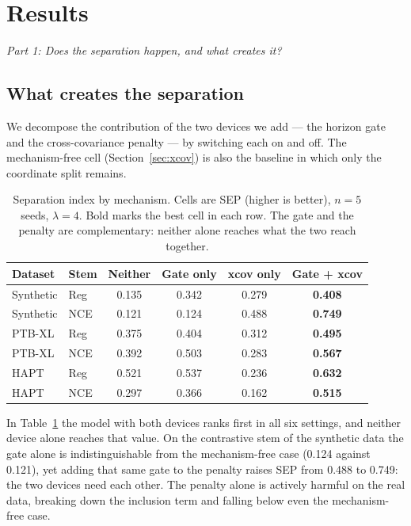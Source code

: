 \section{Results}

\medskip
\noindent\textit{Part 1: Does the separation happen, and what creates it?}

\subsection{What creates the separation}

We decompose the contribution of the two devices we add --- the horizon gate and the cross-covariance penalty --- by switching each on and off. The mechanism-free cell (Section~\ref{sec:xcov}) is also the baseline in which only the coordinate split remains.

\begin{table}[!tbp]
\caption{Separation index by mechanism. Cells are SEP (higher is better), $n=5$ seeds, $\lambda=4$. Bold marks the best cell in each row. The gate and the penalty are complementary: neither alone reaches what the two reach together.}
\label{tab:ablation}
\centering
\scriptsize
\begin{tabular}{llcccc}
\hline
Dataset & Stem & Neither & Gate only & xcov only & \textbf{Gate + xcov} \\
\hline
Synthetic & Reg & 0.135 & 0.342 & 0.279 & \textbf{0.408} \\
Synthetic & NCE & 0.121 & 0.124 & 0.488 & \textbf{0.749} \\
PTB-XL & Reg & 0.375 & 0.404 & 0.312 & \textbf{0.495} \\
PTB-XL & NCE & 0.392 & 0.503 & 0.283 & \textbf{0.567} \\
HAPT & Reg & 0.521 & 0.537 & 0.236 & \textbf{0.632} \\
HAPT & NCE & 0.297 & 0.366 & 0.162 & \textbf{0.515} \\
\hline
\end{tabular}
\end{table}

In Table~\ref{tab:ablation} the model with both devices ranks first in all six settings, and neither device alone reaches that value. On the contrastive stem of the synthetic data the gate alone is indistinguishable from the mechanism-free case (0.124 against 0.121), yet adding that same gate to the penalty raises SEP from 0.488 to 0.749: the two devices need each other. The penalty alone is actively harmful on the real data, breaking down the inclusion term and falling below even the mechanism-free case.

